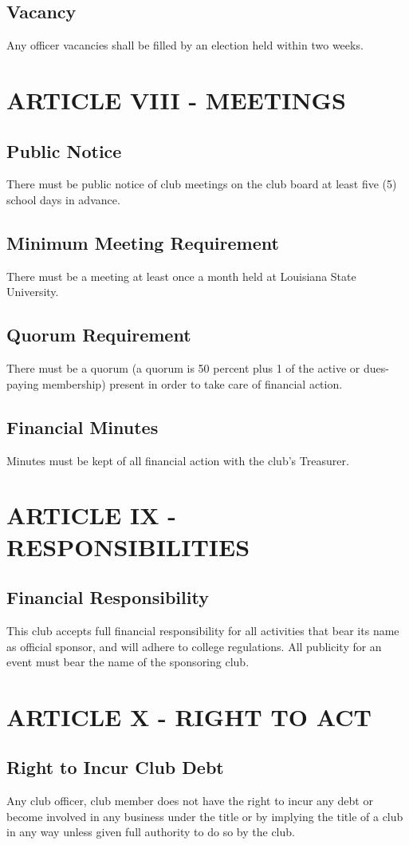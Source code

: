 \documentclass[11pt]{amsart}
\begin{document}
\subsection{Vacancy}
Any officer vacancies shall be filled by an election held within two weeks.


\section{ARTICLE VIII - MEETINGS}
\subsection{Public Notice}
There must be public notice of club meetings on the club board at least five (5) school days in advance.
\subsection{Minimum Meeting Requirement}
There must be a meeting at least once a month held at Louisiana State University.
\subsection{Quorum Requirement}
There must be a quorum (a quorum is 50 percent plus 1 of the active or dues-paying membership) present in order to take care of financial action.
\subsection{Financial Minutes}
Minutes must be kept of all financial action with the club’s Treasurer.

\section{ARTICLE IX - RESPONSIBILITIES}
\subsection{Financial Responsibility}
This club accepts full financial responsibility for all activities that bear its name as official sponsor, and will adhere to college regulations.  All publicity for an event must bear the name of the sponsoring club.

\section{ARTICLE X - RIGHT TO ACT}
\subsection{Right to Incur Club Debt}
Any club officer, club member does not have the right to incur any debt or become involved in any business under the title or by implying the title of a club in any way unless given full authority to do so by the club.
\end{document}
